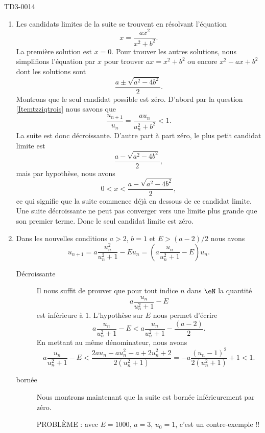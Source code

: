 \begin{corrige}{TD3-0014}
\begin{enumerate}
\item
    Les candidats limites de la suite se trouvent en résolvant l'équation
    \begin{equation}
        x=\frac{ ax^2 }{ x^2+b^2 }.
    \end{equation}
    La première solution est \( x=0\). Pour trouver les autres solutions, nous simplifions l'équation par \( x\) pour trouver \( ax=x^2+b^2\) ou encore \( x^2-ax+b^2\) dont les solutions sont
    \begin{equation}
        \frac{ a\pm\sqrt{a^2-4b^2} }{ 2 }.
    \end{equation}
    Montrons que le seul candidat possible est zéro. D'abord par la question \ref{Itemtzziqtrois} nous savons que
    \begin{equation}
        \frac{ u_{n+1} }{ u_n }=\frac{ a u_{n} }{ u_n^2+b^2 }<1.
    \end{equation}
    La suite est donc décroissante. D'autre part à part zéro, le plus petit candidat limite est 
    \begin{equation}
        \frac{ a-\sqrt{a^2-4b^2} }{ 2 },
    \end{equation}
    mais par hypothèse, nous avons
    \begin{equation}
        0<x<\frac{ a-\sqrt{a^2-4b^2} }{ 2 },
    \end{equation}
    ce qui signifie que la suite commence déjà en dessous de ce candidat limite. Une suite décroissante ne peut pas converger vers une limite plus grande que son premier terme. Donc le seul candidat limite est zéro.

\item Dans les nouvelles conditions $a>2$, $b=1$ et $E> (a-2)/2$ nous avons
  \begin{equation}
    	u_{n+1}=a\frac{ u_n^2 }{ u_n^2+1 }-Eu_n= \left(a\frac{ u_n }{ u_n^2+1 }-E\right)u_n.
  \end{equation}
  \begin{description}
      \item[Décroissante] 
Il nous suffit de prouver que pour tout indice $n$ dans $\eN$ la quantité 
\[
a\frac{ u_n }{ u_n^2+1 }-E
\]
est inférieure à $1$. L'hypothèse sur $E$ nous permet d'écrire
\[
  a\frac{ u_n }{ u_n^2+1 }-E<  a\frac{ u_n }{ u_n^2+1 }-\frac{(a-2)}{2}.
\]
En mettant au même dénominateur, nous avons
\begin{equation}
    a\frac{ u_n }{ u_n^2+1 }-E<\frac{ 2au_n-au_n^2-a+2u_n^2+2 }{ 2(u_n^2+1) }=-a\frac{ (u_n-1)^2 }{ 2(u_n^2+1) }+1<1.
\end{equation}

        \item[bornée]
            Nous montrons maintenant que la suite est bornée inférieurement par zéro.

            PROBLÈME : avec $E=1000$, \( a=3\), \( u_0=1\), c'est un contre-exemple !!

  \end{description}

  \end{enumerate}

\end{corrige}
